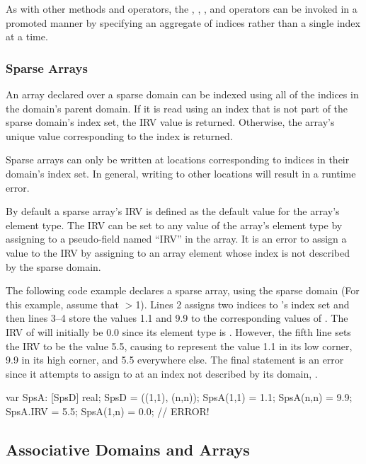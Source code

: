 As with other methods and operators, the , ,
\chpl{+=}, and \chpl{-=} operators can be invoked in a promoted manner
by specifying an aggregate of indices rather than a single index at a
time.

\subsubsection{Sparse Arrays}

An array declared over a sparse domain can be indexed using all of the
indices in the domain's parent domain.  If it is read using an index
that is not part of the sparse domain's index set, the IRV value is
returned.  Otherwise, the array's unique value corresponding to the
index is returned.

Sparse arrays can only be written at locations corresponding to
indices in their domain's index set.  In general, writing to other
locations will result in a runtime error.

By default a sparse array's IRV is defined as the default value for
the array's element type.  The IRV can be set to any value of the
array's element type by assigning to a pseudo-field named ``IRV'' in
the array.  It is an error to assign a value to the IRV by assigning
to an array element whose index is not described by the sparse domain.

\begin{example}
The following code example declares a sparse array,  using
the sparse domain  (For this example, assume that
$>$1).  Lines 2 assigns two indices to 's index set
and then lines 3--4 store the values 1.1 and 9.9 to the corresponding
values of .  The IRV of  will initially be 0.0
since its element type is .  However, the fifth line sets
the IRV to be the value 5.5, causing  to represent the
value 1.1 in its low corner, 9.9 in its high corner, and 5.5
everywhere else.  The final statement is an error since it attempts to
assign to  at an index not described by its domain,
.

\begin{chapel}
var SpsA: [SpsD] real;
SpsD = ((1,1), (n,n));
SpsA(1,1) = 1.1;
SpsA(n,n) = 9.9;
SpsA.IRV = 5.5;
SpsA(1,n) = 0.0;  // ERROR!
\end{chapel}
\end{example}



\subsection{Associative Domains and Arrays}
\label{Associative_Domains_and_Arrays}


